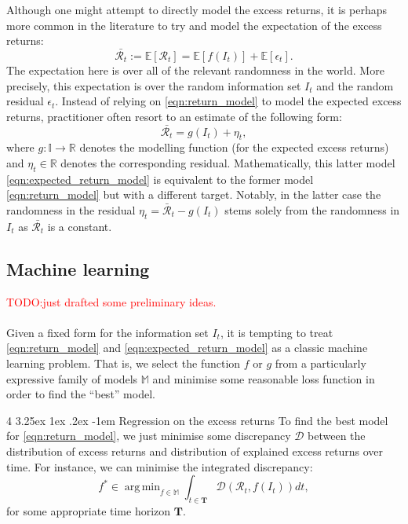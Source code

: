 \documentclass[12pt]{article}
\makeatletter
\renewcommand\paragraph{%
	\@startsection{paragraph}
	{4}
	{\z@}
	{3.25ex \@plus1ex \@minus.2ex}
	{-1em}
	{\normalfont\normalsize\bfseries\maybe@addperiod}%
}
\newcommand{\maybe@addperiod}[1]{%
	#1\@addpunct{.}%
}
\DeclareMathOperator*{\argmin}{arg\,min}
\makeatother
\begin{document}
Although one might attempt to directly model the excess returns, it is perhaps more common in the literature to try and model the expectation of the excess returns:
\begin{equation}
    \bar{\mathcal{R}_t} := \mathbb{E}[\mathcal{R}_t] = \mathbb{E}[f(I_t)] + \mathbb{E}[\epsilon_t].
\end{equation}
The expectation here is over all of the relevant randomness in the world. More precisely, this expectation is over the random information set $I_t$ and the random residual $\epsilon_t$. Instead of relying on \eqref{eqn:return_model} to model the expected excess returns, practitioner often resort to an estimate of the following form:
\begin{equation}
    \bar{\mathcal{R}_t} = g(I_t) + \eta_t,
    \label{eqn:expected_return_model}
\end{equation}
where $g: \mathbb{I} \rightarrow \mathbb{R}$ denotes the modelling function (for the expected excess returns) and $\eta_t \in \mathbb{R}$ denotes the corresponding residual. Mathematically, this latter model \eqref{eqn:expected_return_model} is equivalent to the former model \eqref{eqn:return_model} but with a different target. Notably, in the latter case the randomness in the residual $\eta_t = \bar{\mathcal{R}}_t - g(I_t)$ stems solely from the randomness in $I_t$ as $\bar{\mathcal{R}_t}$ is a constant.
\subsection{Machine learning}
\textcolor{red}{TODO:just drafted some preliminary ideas.}
\\ \\
Given a fixed form for the information set $I_t$, it is tempting to treat \eqref{eqn:return_model} and \eqref{eqn:expected_return_model} as a classic machine learning problem. That is, we select the function $f$ or $g$ from a particularly expressive family of models $\mathbb{M}$ and minimise some reasonable loss function in order to find the ``best'' model. 

\paragraph{Regression on the excess returns} To find the best model for \eqref{eqn:return_model}, we just minimise some discrepancy $\mathcal{D}$ between the distribution of excess returns and distribution of explained excess returns over time. For instance, we can minimise the integrated discrepancy:
\begin{equation}
    f^* \in \argmin_{f \in \mathbb{M}} \int_{t \in \mathbf{T}} \mathcal{D}(\mathcal{R}_t, f(I_t)) dt,
\end{equation}
for some appropriate time horizon $\mathbf{T}$.
\end{document}
